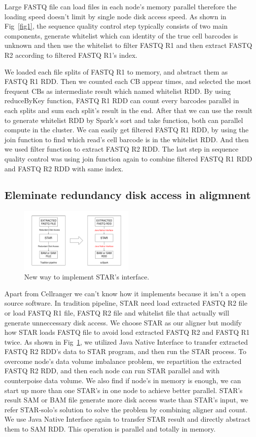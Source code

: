 \documentclass[conference]{IEEEtran}
\begin{document}
Large FASTQ file can load files in each node's memory parallel therefore the loading speed doesn't limit by single node disk access speed. 
As shown in Fig~\ref{fig1}, the sequence quality control step typically consists of two main components, generate whitelist which can identity of the true cell barcodes is unknown and then use the whitelist to filter FASTQ R1 and then extract FASTQ R2 according to filtered FASTQ R1's index. 

We loaded each file splits of FASTQ R1 to memory, and abstract them as FASTQ R1 RDD. 
Then we counted each CB appear times, and selected the most frequent CBs as intermediate result which named whitelist RDD. 
By using reduceByKey function, FASTQ R1 RDD can count every barcodes parallel in each splits and sum each split's result in the end. 
After that we can use the result to generate whitelist RDD by Spark's sort and take function, both can parallel compute in the cluster. 
We can easily get filtered FASTQ R1 RDD, by using the join function to find which read's cell barcode is in the whitelist RDD. 
And then we used filter function to extract FASTQ R2 RDD. 
The last step in sequence quality control was using join function again to combine filtered FASTQ R1 RDD and FASTQ R2 RDD with same index. 

\subsection{Eleminate redundancy disk access in aligmnent}
\begin{figure}
  \includegraphics[width=0.5\textwidth]{fig2.pdf}
  \caption{New way to implement STAR's interface.} \label{fig2}
\end{figure}

Apart from Cellranger we can't know how it implements because it isn't a open source software. 
In tradition pipeline, STAR need load extracted FASTQ R2 file or load FASTQ R1 file, FASTQ R2 file and whitelist file that actually will generate unneccessary disk access. 
We choose STAR as our aligner but modify how STAR loads FASTQ file to avoid load extracted FASTQ R2 and FASTQ R1 twice. 
As shown in Fig~\ref{fig2}, we utilized Java Native Interface to transfer extracted FASTQ R2 RDD's data to STAR program, and then run the STAR process. 
To overcome node's data volume imbalance problem, we repartition the extracted FASTQ R2 RDD, and then each node can run STAR parallel and with counterpoise data volume. 
We also find if node's in memory is enough, we can start up more than one STAR's in one node to achieve better parallel. 
STAR's result SAM or BAM file generate more disk access waste than STAR's input, we refer STAR-solo's solution to solve the problem by combining aligner and count. 
We use Java Native Interface again to transfer STAR result and directly abstract them to SAM RDD. 
This operation is parallel and totally in memory. 
\end{document}
